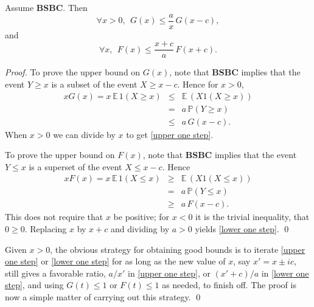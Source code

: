 \documentclass[smallextended,envcountsect]{svjour3}
\begin{document}
\begin{lemma}\label{lemma one step}
Assume {\bf BSBC}.
Then
\begin{equation}\label{upper one step}
\forall x>0, \ \      G(x) \le \frac{a}{x} \, G(x-c),
\end{equation}
and
\begin{equation}\label{lower one step}
  \forall x, \ \ F(x) \le \frac{x+c}{a} \, F(x+c).
\end{equation}
\end{lemma}
\begin{proof}
To prove the upper bound on $G(x)$, note that {\bf BSBC} implies that the event $Y \ge x$ is a subset of the event $X \ge x-c$.  Hence for $x>0$,
\begin{eqnarray*}
x G(x)  = x \, {\mathbb{E \,}} 1(X \ge x) & \le & {\mathbb{E \,}}(X 1(X \ge x)) \\
 &= & a \, {\mathbb{P}}(Y \ge x)
 \\
 &\le& a \,G(x-c).
\end{eqnarray*}
When $x>0$ we can divide by $x$ to get \eqref{upper one step}.

To prove the upper bound on $F(x)$, note that {\bf BSBC} implies that the event $Y \le x$ is a superset of the event $X \le x-c$.  Hence
\begin{eqnarray*}
x F(x)  = x \, {\mathbb{E \,}} 1(X \le x) & \ge & {\mathbb{E \,}}(X 1(X \le x)) \\
 &= & a \, {\mathbb{P}}(Y \le x)
 \\
 &\ge& a \,F(x-c).
\end{eqnarray*}
This does not require that $x$  be positive;  for $x<0$ it is the trivial inequality, that $0 \ge 0$.  Replacing $x$ by $x+c$ and 
dividing by $a>0$ yields \eqref{lower one step}. \qed
\end{proof}

\vspace{2ex}

   Given $x>0$, the obvious strategy for obtaining good bounds is to iterate \eqref{upper one step} or
\eqref{lower one step} for as long as the new value of $x$, say $x'=x \pm i c$, still gives a favorable ratio,
$a/x'$ in \eqref{upper one step}, or $(x'+c)/a$ in \eqref{lower one step}, and using $G(t) \le 1$ or $F(t) \le 1$ as needed, to finish off.  The proof is now a simple matter of carrying out this strategy. \qed
\end{document}
